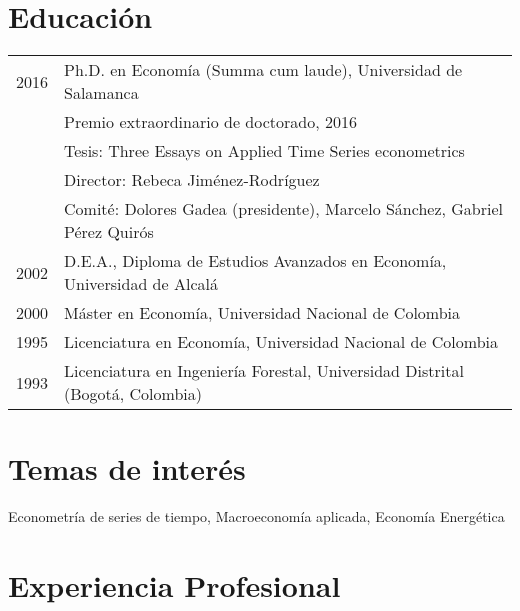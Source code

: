 \documentclass[11pt]{article}\usepackage[]{graphicx}\usepackage[]{color}
\begin{document}
{%
\section{Educación} 

\begin{tabular}{rl{-2cm}} %

2016 & Ph.D. en Economía (Summa cum laude), Universidad de Salamanca\\
\vspace{1pt}& Premio extraordinario de doctorado, 2016\\
\vspace{1pt}& Tesis: Three Essays on Applied Time Series econometrics\\
\vspace{1pt}& Director: Rebeca Jiménez-Rodríguez\\
\vspace{5pt}& Comité: Dolores Gadea (presidente), Marcelo Sánchez, Gabriel Pérez Quirós\\

\vspace{5pt}2002 & D.E.A., Diploma de Estudios Avanzados en Economía, Universidad de Alcalá\\
	 
\vspace{5pt}2000 & Máster en Economía, Universidad Nacional de Colombia\\

\vspace{5pt}1995 & Licenciatura en Economía, Universidad Nacional de Colombia\\

\vspace{5pt}1993 & Licenciatura en Ingeniería Forestal, Universidad Distrital (Bogotá, Colombia)\\

\end{tabular}
\vspace{10pt}

\section{Temas de interés}

Econometría de series de tiempo, Macroeconomía aplicada, Economía Energética

\section{Experiencia Profesional} 

}
\end{document}
